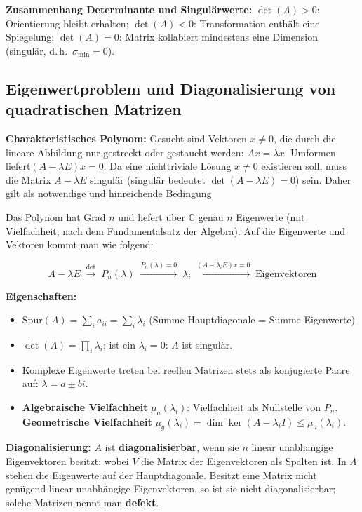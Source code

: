 \textbf{Zusammenhang Determinante und Singulärwerte:}
$\det(A) > 0$: Orientierung bleibt erhalten; $\det(A) < 0$: Transformation enthält eine Spiegelung; $\det(A) = 0$: Matrix kollabiert mindestens eine Dimension (singulär, d.\,h.\ $\sigma_{\min} = 0$).

\newpage

\subsection{Eigenwertproblem und Diagonalisierung von quadratischen Matrizen}

\textbf{Charakteristisches Polynom:} Gesucht sind Vektoren $x \neq 0$, die durch die lineare Abbildung nur gestreckt oder gestaucht werden: $Ax=\lambda x.$ Umformen liefert$(A-\lambda E)x=0.$ Da eine nichttriviale Lösung $x\neq0$ existieren soll, muss die Matrix $A-\lambda E$ singulär (singulär bedeutet $\det(A-\lambda E) = 0$) sein. Daher gilt als notwendige und hinreichende Bedingung


Das Polynom hat Grad $n$ und liefert über $\mathbb{C}$ genau $n$ Eigenwerte (mit Vielfachheit, nach dem Fundamentalsatz der Algebra). Auf die Eigenwerte und Vektoren kommt man wie folgend:

$$
A-\lambda E
\;\xrightarrow{\det}\;
P_n(\lambda)
\;\xrightarrow{P_n(\lambda)=0}\;
\lambda_i
\;\xrightarrow{(A-\lambda_i E)x=0}\;
\text{Eigenvektoren}
$$

\textbf{Eigenschaften:}
\begin{itemize}[leftmargin=1.5em]
    \item $\mathrm{Spur}(A) = \sum_i a_{ii} = \sum_i \lambda_i$ (Summe Hauptdiagonale = Summe Eigenwerte)
    \item $\det(A) = \prod_i \lambda_i$; ist ein $\lambda_i = 0$: $A$ ist singulär.
    \item Komplexe Eigenwerte treten bei reellen Matrizen stets als konjugierte Paare auf: $\lambda = a \pm bi$.
    \item \textbf{Algebraische Vielfachheit} $\mu_a(\lambda_i)$: Vielfachheit als Nullstelle von $P_n$. \textbf{Geometrische Vielfachheit} $\mu_g(\lambda_i) = \dim\ker(A-\lambda_i I) \leq \mu_a(\lambda_i)$.
\end{itemize}

\textbf{Diagonalisierung:} $A$ ist \textbf{diagonalisierbar}, wenn sie $n$ linear unabhängige Eigenvektoren besitzt:
wobei $V$ die Matrix der Eigenvektoren als Spalten ist. In $\Lambda$ stehen die Eigenwerte auf der Hauptdiagonale. Besitzt eine Matrix nicht genügend linear unabhängige Eigenvektoren, so ist sie nicht diagonalisierbar; solche Matrizen nennt man \textbf{defekt}.

